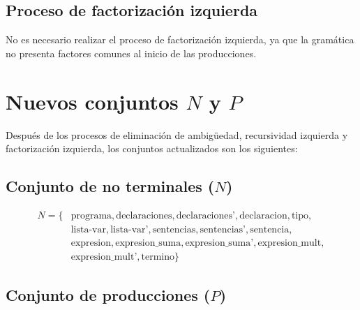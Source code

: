 \documentclass{article}
\begin{document}
\subsection*{Proceso de factorización izquierda}

No es necesario realizar el proceso de factorización izquierda, ya que la gramática no presenta factores comunes al inicio de las producciones.


\section*{Nuevos conjuntos \( N \) y \( P \)}

Después de los procesos de eliminación de ambigüedad, recursividad izquierda y factorización izquierda, los conjuntos actualizados son los siguientes:

\subsection*{Conjunto de no terminales (\( N \))}

\[
\begin{aligned}
N = \{ &\text{programa}, \text{declaraciones}, \text{declaraciones'}, \text{declaracion}, \text{tipo}, \\
       &\text{lista-var}, \text{lista-var'}, \text{sentencias}, \text{sentencias'}, \text{sentencia}, \\
       &\text{expresion}, \text{expresion\_suma}, \text{expresion\_suma'}, \text{expresion\_mult}, \\
       &\text{expresion\_mult'}, \text{termino} \}
\end{aligned}
\]


\subsection*{Conjunto de producciones (\( P \))}
\end{document}
